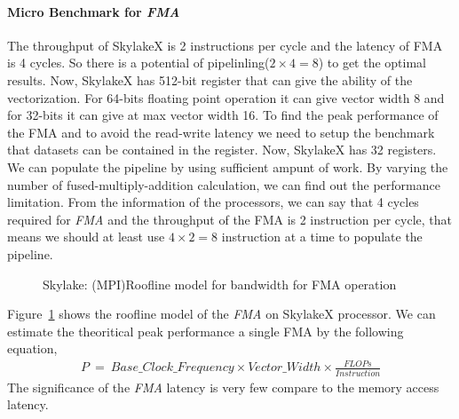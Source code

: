 \documentclass[conference, 10ppt]{IEEEtran}
\begin{document}
\paragraph{Micro Benchmark for \textit{FMA}}
The throughput of SkylakeX is 2 instructions per cycle and the latency of FMA is 4 cycles. So there is a potential 
of pipelinling($2\times 4 = 8$) to get the optimal results. Now, SkylakeX 
has 512-bit register that can give the ability of the vectorization. For 64-bits floating point operation it can give vector 
width 8 and for 32-bits it can give at max vector width 16. To find the peak performance of the FMA and to avoid the 
read-write latency we need to setup the benchmark that datasets can be contained in the register. Now, SkylakeX has 32 
registers. We can populate the pipeline by using sufficient ampunt of work. By varying the 
number of fused-multiply-addition calculation, we can find out the performance limitation. From the information of the 
processors, we can say that 4 cycles required for \textit{FMA} and the throughput of the FMA is 2 instruction per cycle, that means 
we should at least use $4\times 2=8$ instruction at a time to populate the pipeline.
\begin{figure}[hbt!]
	\centering
	\caption{Skylake: (MPI)Roofline model for bandwidth for FMA operation}
	\label{fig:mpi-skl-fma}
\end{figure}
Figure~\ref{fig:mpi-skl-fma} shows the roofline model of the \textit{FMA} on SkylakeX processor. 
We can estimate the theoritical peak performance a single FMA by the following equation,
\begin{eqnarray*}
P\ =\ Base\_Clock\_Frequency\times Vector\_Width\times \frac{FLOPs}{Instruction}
\end{eqnarray*}
The significance of the \textit{FMA} 
latency is very few compare to the memory access latency. 
\end{document}

